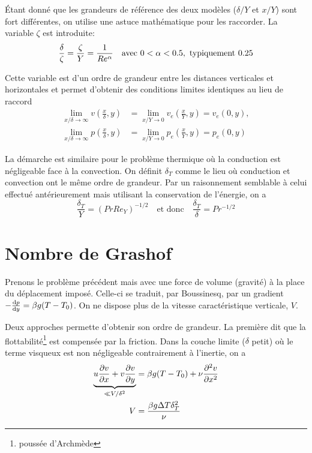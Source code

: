     Étant donné que les grandeurs de référence des deux modèles ($\delta/Y$ et $x/Y$) sont fort différentes, on utilise une astuce mathématique pour les raccorder. La variable $\zeta$ est introduite:
    \begin{equation}
      \frac{\delta}{\zeta} = \frac{\zeta}{Y} = \frac{1}{Re^\alpha} \quad \textrm{avec } 0 < \alpha < 0.5,\textrm{ typiquement } 0.25
    \end{equation}

    Cette variable est d'un ordre de grandeur entre les distances verticales et horizontales et permet d'obtenir des conditions limites identiques au lieu de raccord
    \begin{equation}
      \begin{aligned}
        \lim_{x/\delta\rightarrow \infty} v\left(\frac{x}{\delta},y\right) &= \lim_{x/Y \rightarrow 0} v_e\left(\frac{x}{Y}, y\right) = v_e (0, y),\\
        \lim_{x/\delta \rightarrow \infty} p\left(\frac{x}{\delta},y\right) &= \lim_{x/Y \rightarrow 0} p_e\left(\frac{x}{Y},y\right) = p_e (0, y)
      \end{aligned}
    \end{equation}

    La démarche est similaire pour le problème thermique où la conduction est négligeable face à la convection. On définit $\delta_T$ comme le lieu où conduction et convection ont le même ordre de grandeur. Par un raisonnement semblable à celui effectué antérieurement mais utilisant la conservation de l'énergie, on a
    \begin{equation}
      \frac{\delta_T}{Y} = (Pr Re_Y)^{-1/2} \quad \textrm{et donc} \quad \frac{\delta_T}{\delta} = Pr^{-1/2}
    \end{equation}

  \section{Nombre de Grashof}
    Prenons le problème précédent mais avec une force de volume (gravité) à la place du déplacement imposé. Celle-ci se traduit, par Boussinesq, par un gradient $-\dv{p}{y} = \beta g(T-T_0)$. On ne dispose plus de la vitesse caractéristique verticale, $V$.

    Deux approches permette d'obtenir son ordre de grandeur. La première dit que la flottabilité\footnote{poussée d'Archmède} est compensée par la friction. Dans la couche limite ($\delta$ petit) où le terme visqueux est non négligeable contrairement à l'inertie, on a
    \begin{equation}
      \begin{aligned}
        \underbrace{u\pdv{v}{x} + v\pdv{v}{y}}_{\ll V/\delta^2} &= \beta g (T-T_0) + \nu \pdv[2]{v}{x}\\
        V &= \frac{\beta g \Delta T \delta_T^2}{\nu}
      \end{aligned}
    \end{equation}

